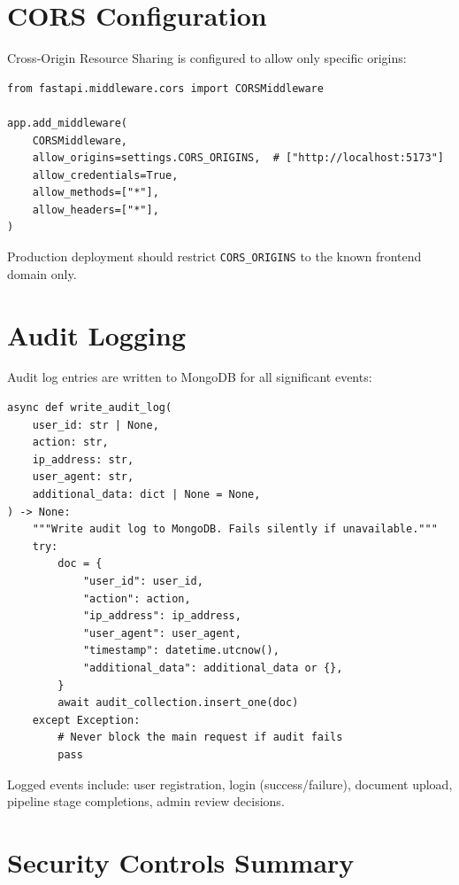 \section{CORS Configuration}

Cross-Origin Resource Sharing is configured to allow only specific origins:

\begin{lstlisting}[style=pythonstyle, caption=CORS Configuration]
from fastapi.middleware.cors import CORSMiddleware

app.add_middleware(
    CORSMiddleware,
    allow_origins=settings.CORS_ORIGINS,  # ["http://localhost:5173"]
    allow_credentials=True,
    allow_methods=["*"],
    allow_headers=["*"],
)
\end{lstlisting}

Production deployment should restrict \texttt{CORS\_ORIGINS} to the known frontend domain only.

\section{Audit Logging}

Audit log entries are written to MongoDB for all significant events:

\begin{lstlisting}[style=pythonstyle, caption=Audit Log Service]
async def write_audit_log(
    user_id: str | None,
    action: str,
    ip_address: str,
    user_agent: str,
    additional_data: dict | None = None,
) -> None:
    """Write audit log to MongoDB. Fails silently if unavailable."""
    try:
        doc = {
            "user_id": user_id,
            "action": action,
            "ip_address": ip_address,
            "user_agent": user_agent,
            "timestamp": datetime.utcnow(),
            "additional_data": additional_data or {},
        }
        await audit_collection.insert_one(doc)
    except Exception:
        # Never block the main request if audit fails
        pass
\end{lstlisting}

Logged events include: user registration, login (success/failure), document upload, pipeline stage completions, admin review decisions.

\section{Security Controls Summary}

